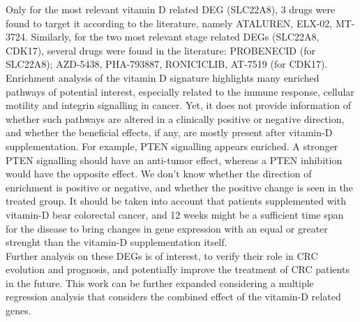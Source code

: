 \documentclass[fleqn,10pt]{SelfArx} %
\begin{document}
	Only for the most relevant vitamin D related DEG (SLC22A8), 3 drugs were found to target it according to the literature, namely ATALUREN, ELX-02, MT-3724. Similarly, for the two most relevant stage related DEGs (SLC22A8, CDK17), several drugs were found in the literature: PROBENECID (for SLC22A8); AZD-5438, PHA-793887, RONICICLIB, AT-7519 (for CDK17). \\
Enrichment analysis of the vitamin D signature highlights many enriched pathways of potential interest, especially related to the immune response, cellular motility and integrin signalling in cancer. Yet, it does not provide information of whether such pathways are altered in a clinically positive or negative direction, and whether the beneficial effects, if any, are mostly present after vitamin-D supplementation.
For example, PTEN signalling appears enriched. A stronger PTEN signalling should have an anti-tumor effect, whereas a PTEN inhibition would have the opposite effect. We don’t know whether the direction of enrichment is positive or negative, and whether the positive change is seen in the treated group.
It should be taken into account that patients supplemented with vitamin-D bear colorectal cancer, and 12 weeks might be a sufficient time span for the disease to bring changes in gene expression with an equal or greater strenght than the vitamin-D supplementation itself.\\
	Further analysis on these DEGs is of interest, to verify their role in CRC evolution and prognosis, and potentially improve the treatment of CRC patients in the future.
	This work can be further expanded considering a multiple regression analysis that considers the combined effect of the vitamin-D related genes.





\end{document}
